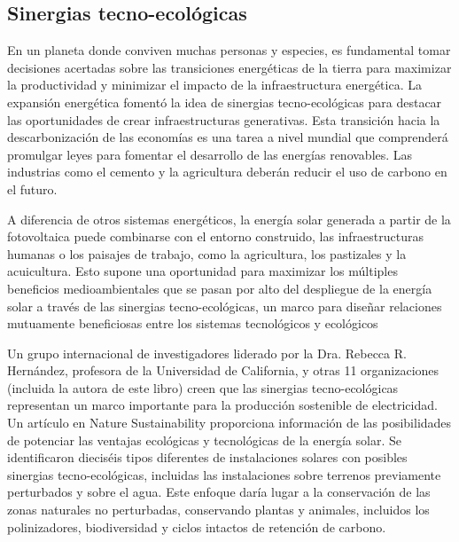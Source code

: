 \documentclass[runningheads]{llncs}
\begin{document}
\subsection*{Sinergias tecno-ecológicas}
En un planeta donde conviven muchas personas y especies, es fundamental tomar decisiones acertadas sobre las transiciones energéticas de la tierra para maximizar la productividad y minimizar el impacto de la infraestructura energética. La expansión energética fomentó la idea de sinergias tecno-ecológicas para destacar las oportunidades de crear infraestructuras generativas. Esta transición hacia la descarbonización de las economías es una tarea a nivel mundial que comprenderá promulgar leyes para fomentar el desarrollo de las energías renovables. Las industrias como el cemento y la agricultura deberán reducir el uso de carbono en el futuro.\\ \par
A diferencia de otros sistemas energéticos, la energía solar generada a partir de la fotovoltaica puede combinarse con el entorno construido, las infraestructuras humanas o los paisajes de trabajo, como la agricultura, los pastizales y la acuicultura. Esto supone una oportunidad para maximizar los múltiples beneficios medioambientales que se pasan por alto del despliegue de la energía solar a través de las sinergias tecno-ecológicas, un marco para diseñar relaciones mutuamente beneficiosas entre los sistemas tecnológicos y ecológicos\\ \par
Un grupo internacional de investigadores liderado por la Dra. Rebecca R. Hernández, profesora de la Universidad de California, y otras 11 organizaciones (incluida la autora de este libro) creen que las sinergias tecno-ecológicas representan un marco importante para la producción sostenible de electricidad. Un artículo en Nature Sustainability proporciona información de las posibilidades de potenciar las ventajas ecológicas y tecnológicas de la energía solar. Se identificaron dieciséis tipos diferentes de instalaciones solares con posibles sinergias tecno-ecológicas, incluidas las instalaciones sobre terrenos previamente perturbados y sobre el agua. Este enfoque daría lugar a la conservación de las zonas naturales no perturbadas, conservando plantas y animales, incluidos los polinizadores, biodiversidad y ciclos intactos de retención de carbono.\\ \par
\end{document}
